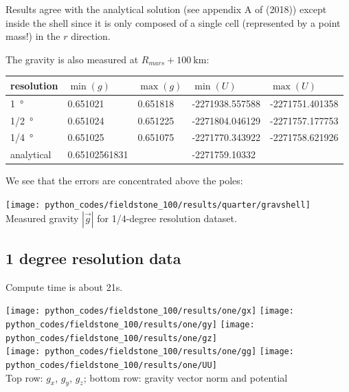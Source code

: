 Results agree with the analytical solution (see appendix A of \textcite{thie18} (2018))
except inside the shell since it is only composed of a 
single cell (represented by a point mass!) in the $r$ direction. 

The gravity is also measured at $R_{mars}+100~\si{\km}$:

\begin{center}
\begin{tabular}{lllll}
\hline
resolution        & $\min(g)$ & $\max(g)$ & $\min(U)$ & $\max(U)$ \\
\hline
\hline
1~\si{\degree}    & 0.651021 & 0.651818 & -2271938.557588 & -2271751.401358 \\
1/2~\si{\degree}  & 0.651024 & 0.651225 & -2271804.046129 & -2271757.177753 \\
1/4~\si{\degree}  & 0.651025 & 0.651075 & -2271770.343922 & -2271758.621926 \\
\hline
analytical & 0.65102561831 & & -2271759.10332  \\
\hline
\end{tabular}
\end{center}
We see that the errors are concentrated above the poles:


\begin{center}
\texttt{[image: python\_codes/fieldstone\_100/results/quarter/gravshell]}\\
{\captionfont Measured gravity $|\vec{g}|$ for 1/4-degree resolution dataset.}
\end{center}






\newpage
\subsection*{1 degree resolution data}

Compute time is about 21s. 

\begin{center}
\texttt{[image: python\_codes/fieldstone\_100/results/one/gx]}
\texttt{[image: python\_codes/fieldstone\_100/results/one/gy]}
\texttt{[image: python\_codes/fieldstone\_100/results/one/gz]}\\
\texttt{[image: python\_codes/fieldstone\_100/results/one/gg]}
\texttt{[image: python\_codes/fieldstone\_100/results/one/UU]}\\
{\captionfont Top row: $g_x$, $g_y$, $g_z$;
bottom row: gravity vector norm and potential}
\end{center}

